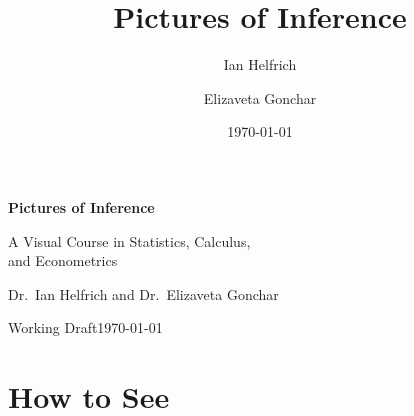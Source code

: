 


\title{Pictures of Inference}
\author{Ian Helfrich \and Elizaveta Gonchar}
\date{\today}



\begin{titlepage}
\centering
\vspace*{2in}
{\Huge\bfseries Pictures of Inference\par}
\vspace{0.4in}
{\Large A Visual Course in Statistics, Calculus,\\ and Econometrics\par}
\vspace{0.8in}
{\large Dr.\ Ian Helfrich \quad and \quad Dr.\ Elizaveta Gonchar\par}
\vspace{2in}
{\normalsize Working Draft\quad\textemdash\quad \today\par}
\end{titlepage}

\frontmatter
\tableofcontents

\mainmatter

\part{How to See}

% 
% 
% 
% 
% 




\backmatter

% 


